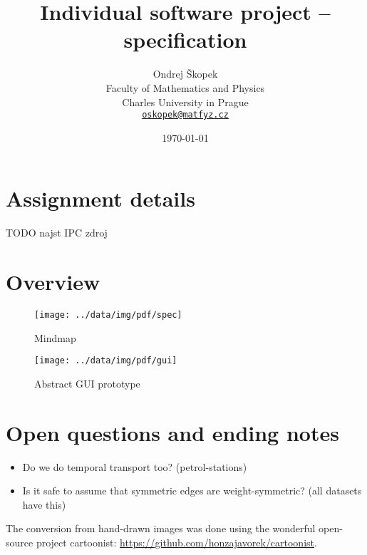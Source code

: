 \documentclass[10pt,a4paper,oneside]{article}
\author{Ondrej Škopek\\
Faculty of Mathematics and Physics\\
Charles University in Prague\\
\texttt{\href{mailto:oskopek@matfyz.cz}{oskopek@matfyz.cz}}}
\title{Individual software project -- specification}
\date{\today}
\begin{document}
\maketitle

\section{Assignment details}

TODO najst IPC zdroj

\section{Overview}

\FloatBarrier
\begin{figure}
        \centering
        \texttt{[image: ../data/img/pdf/spec]}
        \caption{Mindmap}
        \label{fig:mindmap}
\end{figure}
\begin{figure}
        \centering
        \texttt{[image: ../data/img/pdf/gui]}
        \caption{Abstract GUI prototype}
        \label{fig:gui}
\end{figure}

\FloatBarrier




\section{Open questions and ending notes}

\begin{itemize}
    \item Do we do temporal transport too? (petrol-stations)
    \item Is it safe to assume that symmetric edges are weight-symmetric? (all datasets have this)
\end{itemize}

The conversion from hand-drawn images was done using the wonderful
open-source project cartoonist: \url{https://github.com/honzajavorek/cartoonist}.
\end{document}
